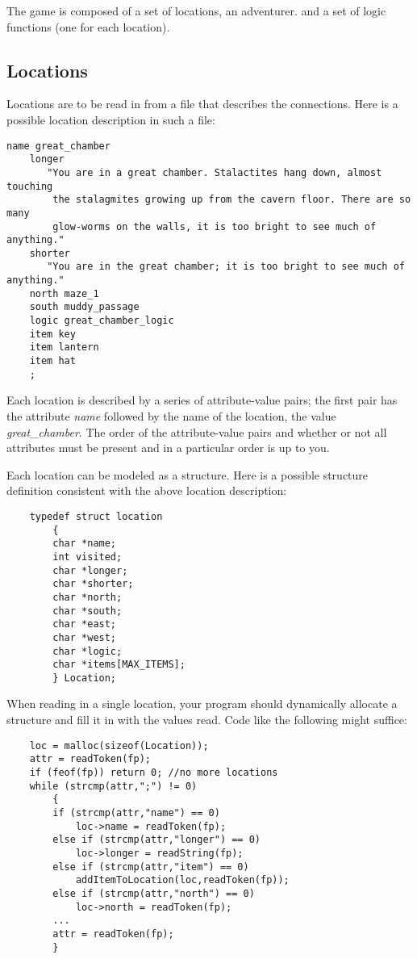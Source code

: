 \documentclass[12pt]{article}
\begin{document}
The game is composed of a set of locations,
an adventurer.
and a set of logic functions (one for each location).

\subsection{Locations}

Locations are to be read in from a file that
describes the connections. Here is a possible location description
in such a file:

\begin{verbatim}
name great_chamber
    longer
       "You are in a great chamber. Stalactites hang down, almost touching
        the stalagmites growing up from the cavern floor. There are so many
        glow-worms on the walls, it is too bright to see much of anything."
    shorter
       "You are in the great chamber; it is too bright to see much of anything."
    north maze_1
    south muddy_passage
    logic great_chamber_logic
    item key
    item lantern
    item hat
    ;
\end{verbatim}

Each location is described by a series of attribute-value pairs; the first
pair has the attribute {\it name} followed by the name of the location,
the value {\it great\_chamber}.
The order of the attribute-value pairs and whether or not all attributes must
be present and in a particular order is up to you.

Each location can be modeled as a structure.
Here is a possible structure definition consistent with the above
location description:

\begin{verbatim}
    typedef struct location
        {
        char *name;
        int visited;
        char *longer;
        char *shorter;
        char *north;
        char *south;
        char *east;
        char *west;
        char *logic;
        char *items[MAX_ITEMS];
        } Location;
\end{verbatim}

When reading in a single location, your program should dynamically
allocate a structure and fill it in with the values read.
Code like the following might suffice:

\begin{verbatim}
    loc = malloc(sizeof(Location));
    attr = readToken(fp);
    if (feof(fp)) return 0; //no more locations
    while (strcmp(attr,";") != 0) 
        {
        if (strcmp(attr,"name") == 0)
            loc->name = readToken(fp);
        else if (strcmp(attr,"longer") == 0)
            loc->longer = readString(fp);
        else if (strcmp(attr,"item") == 0)
            addItemToLocation(loc,readToken(fp));
        else if (strcmp(attr,"north") == 0)
            loc->north = readToken(fp);
        ...
        attr = readToken(fp);
        }
\end{verbatim}
\end{document}
